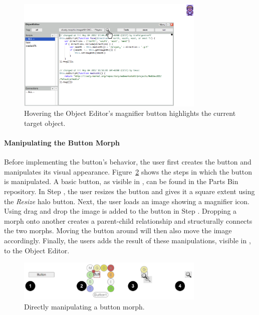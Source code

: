 \begin{figure}[h]
    \centering
    \includegraphics[width=0.8\textwidth]{figures/3_motivation/2_magnifierBehavior.png}
    \caption{Hovering the Object Editor's magnifier button highlights the current target object.}
    \label{fig:MagnifierBehavior}
\end{figure}

\paragraph{Manipulating the Button Morph}
Before implementing the button's behavior, the user first creates the button and manipulates its visual appearance.
Figure~\ref{fig:ButtonBuilding} shows the steps in which the button is manipulated.
A basic button, as visible in , can be found in the Parts Bin repository.
In Step , the user resizes the button and gives it a square extent using the \emph{Resize} halo button.
Next, the user loads an image showing a magnifier icon.
Using drag and drop the image is added to the button in Step .
Dropping a morph onto another creates a parent-child relationship and structurally connects the two morphs.
Moving the button around will then also move the image accordingly.
Finally, the users adds the result of these manipulations, visible in , to the Object Editor.

\begin{figure}[h]
    \centering
    \includegraphics[width=0.8\textwidth]{figures/3_motivation/3_buildingTheButton.png}
    \caption{Directly manipulating a button morph.}
    \label{fig:ButtonBuilding}
\end{figure}

